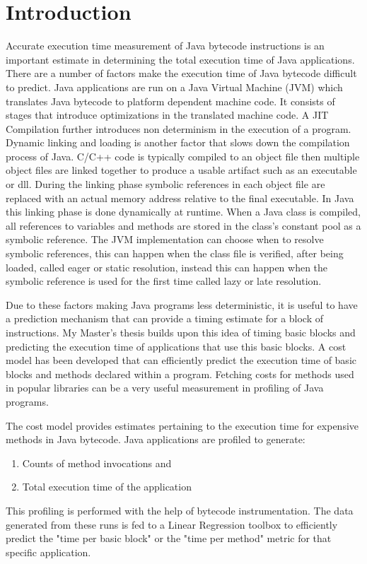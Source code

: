 \chapter{Introduction}
\label{introchap}
Accurate execution time measurement of Java bytecode instructions is an important estimate in determining the total execution time of Java applications. There are a number of factors make the execution time of Java bytecode difficult to predict. Java applications are run on a Java Virtual Machine (JVM) which translates Java bytecode to platform dependent machine code. It consists of stages that introduce optimizations in the translated machine code. A JIT Compilation further introduces non determinism in the execution of a program. Dynamic linking and loading is another factor that slows down the compilation process of Java. C/C++ code is typically compiled to an object file then multiple object files are linked together to produce a usable artifact such as an executable or dll. During the linking phase symbolic references in each object file are replaced with an actual memory address relative to the final executable. In Java this linking phase is done dynamically at runtime. When a Java class is compiled, all references to variables and methods are stored in the class's constant pool as a symbolic reference. The JVM implementation can choose when to resolve symbolic references, this can happen when the class file is verified, after being loaded, called eager or static resolution, instead this can happen when the symbolic reference is used for the first time called lazy or late resolution. \newline


Due to these factors making Java programs less deterministic, it is useful to have a prediction mechanism that can provide a timing estimate for a block of instructions. My Master's thesis builds upon this idea of timing basic blocks and predicting the execution time of applications that use this basic blocks. A cost model has been developed that can efficiently predict the execution time of basic blocks and methods declared within a program. Fetching costs for methods used in popular libraries can be a very useful measurement in profiling of Java programs.\newline


The cost model provides estimates pertaining to the execution time for expensive methods in Java bytecode. Java applications are profiled to generate: 
\begin{enumerate}
\item Counts of method invocations and 
\item Total execution time of the application  
\end{enumerate}
This profiling is performed with the help of bytecode instrumentation. The data generated from these runs is fed to a Linear Regression toolbox to efficiently predict the "time per basic block" or the "time per method" metric for that specific application.\newline


